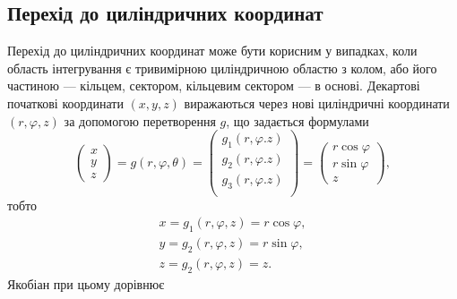 \subsection{Перехід до циліндричних координат}
Перехід до циліндричних координат може бути корисним у випадках, коли область інтегрування є тривимірною циліндричною областю з колом, або його частиною --- кільцем, сектором, кільцевим сектором --- в основі. Декартові початкові координати ${\left(x, y, z\right)}$ виражаються через нові циліндричні координати ${\left(r, \varphi, z\right)}$ за допомогою перетворення $g$, що задається формулами
\[
\left(\begin{array}{c}x\\y\\z\end{array}\right) = g\left(r, \varphi, \theta\right) =
\left(
\begin{array}{c}
g_1\left(r,\varphi. z\right)\\
g_2\left(r,\varphi. z\right)\\
g_3\left(r,\varphi. z\right)\\
\end{array}
\right)=
\left(
\begin{array}{c}
r \cos\varphi\\
r \sin\varphi\\
z
\end{array}
\right),
\]
тобто
\begin{align*}
x = g_1\left(r, \varphi, z\right)= r \cos\varphi,\\
y = g_2\left(r, \varphi, z\right)= r \sin\varphi,\\
z = g_2\left(r, \varphi, z\right)= z.
\end{align*}
Якобіан при цьому дорівнює
